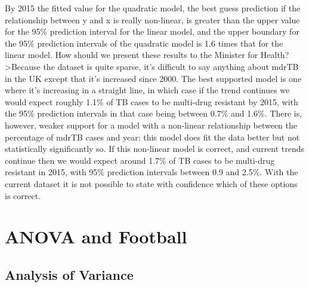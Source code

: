 \documentclass[
]{book}
\begin{document}
By 2015 the fitted value for the quadratic model, the best guess prediction if the relationship between y and x is really non-linear, is greater than the upper value for the 95\% prediction interval for the linear model, and the upper boundary for the 95\% prediction intervals of the quadratic model is 1.6 times that for the linear model. How should we present these results to the Minister for Health?
\textgreater Because the dataset is quite sparse, it's difficult to say anything about mdrTB in the UK except that it's increased since 2000. The best supported model is one where it's increasing in a straight line, in which case if the trend continues we would expect roughly 1.1\% of TB cases to be multi-drug resistant by 2015, with the 95\% prediction intervals in that case being between 0.7\% and 1.6\%. There is, however, weaker support for a model with a non-linear relationship between the percentage of mdrTB cases and year: this model does fit the data better but not statistically significantly so. If this non-linear model is correct, and current trends continue then we would expect around 1.7\% of TB cases to be multi-drug resistant in 2015, with 95\% prediction intervals between 0.9 and 2.5\%. With the current dataset it is not possible to state with confidence which of these options is correct.

\hypertarget{anova-and-football}{%
\chapter{ANOVA and Football}\label{anova-and-football}}

\hypertarget{analysis-of-variance}{%
\section{Analysis of Variance}\label{analysis-of-variance}}
\end{document}

